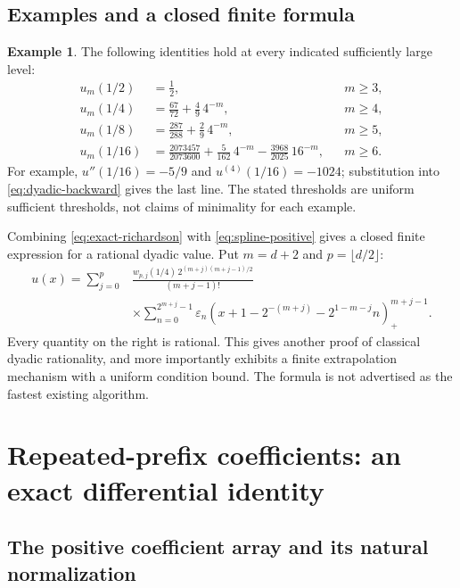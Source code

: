\documentclass[11pt,a4paper]{article}
\numberwithin{equation}{section}
\theoremstyle{definition}
\newtheorem{example}[example]{Example}
\newcommand{\eps}{\varepsilon}
\begin{document}
\subsection{Examples and a closed finite formula}

\begin{example}
The following identities hold at every indicated sufficiently large level:
\begin{align}
 u_m(1/2)&=\frac12, &&m\geq3,\label{eq:examples-dyadic}\\
 u_m(1/4)&=\frac{67}{72}+\frac49\,4^{-m}, &&m\geq4,\nonumber\\
 u_m(1/8)&=\frac{287}{288}+\frac29\,4^{-m}, &&m\geq5,\nonumber\\
 u_m(1/16)&=\frac{2073457}{2073600}
          +\frac5{162}\,4^{-m}
          -\frac{3968}{2025}\,16^{-m}, &&m\geq6.\nonumber
\end{align}
For example, $u''(1/16)=-5/9$ and $u^{(4)}(1/16)=-1024$;
substitution into \eqref{eq:dyadic-backward} gives the last line.
The stated thresholds are uniform sufficient thresholds, not claims
of minimality for each example.
\end{example}

Combining \eqref{eq:exact-richardson} with
\eqref{eq:spline-positive} gives a closed finite expression for a
rational dyadic value. Put $m=d+2$ and $p=\lfloor d/2\rfloor$:
\begin{equation}
\begin{split}
 u(x)=\sum_{j=0}^p &\frac{w_{p,j}(1/4)\,2^{(m+j)(m+j-1)/2}}
                         {(m+j-1)!}\\[-2pt]
 &\times\sum_{n=0}^{2^{m+j}-1}\eps_n
 \left(x+1-2^{-(m+j)}-2^{1-m-j}n\right)_+^{m+j-1}.
\end{split}
\label{eq:closed-dyadic}
\end{equation}
Every quantity on the right is rational. This gives another proof
of classical dyadic rationality, and more importantly exhibits a
finite extrapolation mechanism with a uniform condition bound.
The formula is not advertised as the fastest existing algorithm.

\section{Repeated-prefix coefficients: an exact differential identity}\label{sec:lattice}

\subsection{The positive coefficient array and its natural normalization}
\end{document}
